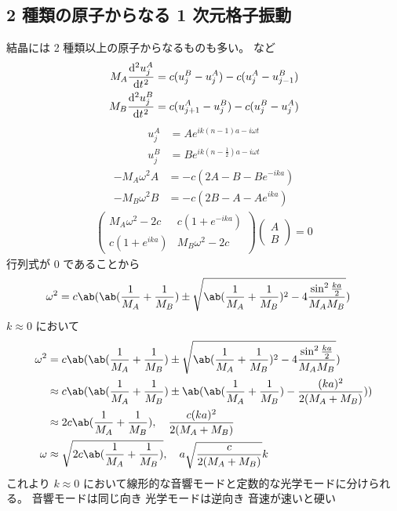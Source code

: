 \documentclass[uplatex,dvipdfmx,a4paper,11pt]{jlreq}
\begin{document}
\subsection{2 種類の原子からなる 1 次元格子振動}
結晶には 2 種類以上の原子からなるものも多い。
 など
\begin{align}
  M_A\diff[2]{u_j^A}{t} & = c(u_j^B - u_j^A) - c(u_j^A - u_{j-1}^B) \\
  M_B\diff[2]{u_j^B}{t} & = c(u_{j+1}^A - u_j^B) - c(u_j^B - u_j^A)
\end{align}
\begin{align}
  u_j^A & = Ae^{ik(n-1)a - i\omega t}           \\
  u_j^B & = Be^{ik(n-\frac{1}{2})a - i\omega t}
\end{align}
\begin{align}
  -M_A\omega^2A & = -c(2A - B - Be^{-ika}) \\
  -M_B\omega^2B & = -c(2B - A - Ae^{ika})
\end{align}
\begin{align}
  \begin{pmatrix}
    M_A\omega^2 - 2c & c(1 + e^{-ika})  \\
    c(1 + e^{ika})   & M_B\omega^2 - 2c
  \end{pmatrix}
  \begin{pmatrix}
    A \\ B
  \end{pmatrix}
  = 0
\end{align}
行列式が $0$ であることから
\begin{align}
  \omega^2 & = c\ab(\ab(\frac{1}{M_A} + \frac{1}{M_B})\pm\sqrt{\ab(\frac{1}{M_A} + \frac{1}{M_B})^2 - 4\frac{\sin^2\frac{ka}{2}}{M_AM_B}})
\end{align}
$k \approx 0$ において
\begin{align}
  \omega^2 & = c\ab(\ab(\frac{1}{M_A} + \frac{1}{M_B})\pm\sqrt{\ab(\frac{1}{M_A} + \frac{1}{M_B})^2 - 4\frac{\sin^2\frac{ka}{2}}{M_AM_B}}) \\
           & \approx c\ab(\ab(\frac{1}{M_A} + \frac{1}{M_B})\pm\ab(\ab(\frac{1}{M_A} + \frac{1}{M_B}) - \frac{(ka)^2}{2(M_A + M_B)}))      \\
           & \approx 2c\ab(\frac{1}{M_A} + \frac{1}{M_B}), \quad \frac{c(ka)^2}{2(M_A + M_B)}                                              \\
  \omega   & \approx \sqrt{2c\ab(\frac{1}{M_A} + \frac{1}{M_B})}, \quad a\sqrt{\frac{c}{2(M_A + M_B)}}k
\end{align}
これより $k \approx 0$ において線形的な音響モードと定数的な光学モードに分けられる。
音響モードは同じ向き
光学モードは逆向き
音速が速いと硬い
\end{document}
